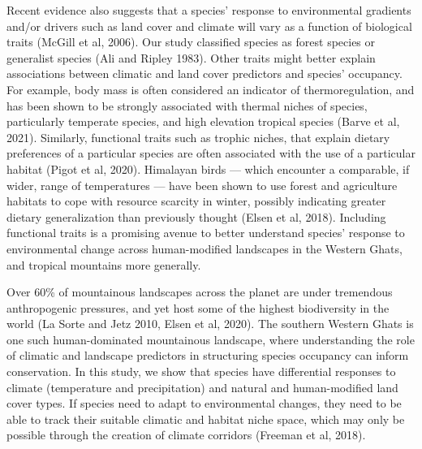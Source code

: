 Recent evidence also suggests that a species' response to environmental gradients and/or drivers such as land cover and climate will vary as a function of biological traits (McGill et al, 2006).
Our study classified species as forest species or generalist species (Ali and Ripley 1983).
Other traits might better explain associations between climatic and land cover predictors and species' occupancy.
For example, body mass is often considered an indicator of thermoregulation, and has been shown to be strongly associated with thermal niches of species, particularly temperate species, and high elevation tropical species (Barve et al, 2021).
Similarly, functional traits such as trophic niches, that explain dietary preferences of a particular species are often associated with the use of a particular habitat (Pigot et al, 2020).
Himalayan birds --- which encounter a comparable, if wider, range of temperatures --- have been shown to use forest and agriculture habitats to cope with resource scarcity in winter, possibly indicating greater dietary generalization than previously thought (Elsen et al, 2018).
Including functional traits is a promising avenue to better understand species' response to environmental change across human-modified landscapes in the Western Ghats, and tropical mountains more generally.

Over 60\% of mountainous landscapes across the planet are under tremendous anthropogenic pressures, and yet host some of the highest biodiversity in the world (La Sorte and Jetz 2010, Elsen et al, 2020).
The southern Western Ghats is one such human-dominated mountainous landscape, where understanding the role of climatic and landscape predictors in structuring species occupancy can inform conservation.
In this study, we show that species have differential responses to climate (temperature and precipitation) and natural and human-modified land cover types.
If species need to adapt to environmental changes, they need to be able to track their suitable climatic and habitat niche space, which may only be possible through the creation of climate corridors (Freeman et al, 2018).
